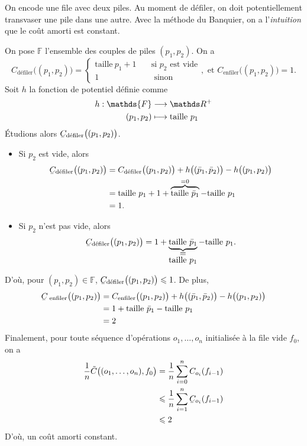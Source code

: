 \documentclass[a4paper]{article}
\begin{document}
	\begin{exm}
		On encode une file avec deux piles.
		Au moment de défiler, on doit potentiellement transvaser une pile dans une autre.
		Avec la méthode du Banquier, on a l'\textit{intuition} que le coût amorti est constant.

		On pose $\mathds{F}$\/ l'ensemble des couples de piles $(p_1, p_2)$.
		On a \[
			C_\text{défiler}\big((p_1, p_2)\big) = \begin{cases}
				\mathrm{taille}\ p_1 + 1 \quad& \text{si $p_2$ est vide}\\
				1 \quad& \text{ sinon}
			\end{cases}, \text{ et } C_\text{enfiler}\big((p_1, p_2)\big) = 1
		.\] Soit $h$\/ la fonction de potentiel définie comme \begin{align*}
			h: \mathds{F} &\longrightarrow \R^+ \\
			(p_1, p_2) &\longmapsto \mathrm{taille}\ p_1
		\end{align*}
		Étudions alors $\ubar{C}_\text{défiler}\big((p_1, p_2)\big)$.
		\begin{itemize}
			\item Si $p_2$\/ est vide, alors
				\begin{align*}
					\ubar{C}_\text{défiler}\big((p_1, p_2)\big) &= C_\text{défiler}\big((p_1,p_2)\big) + h\big((\bar{p}_1, \bar{p}_2)\big) - h\big((p_1, p_2)\big)\\
					&= \mathrm{taille} \ p_1 + 1 + \overbrace{\mathrm{taille}\ \bar{p}_1}^{=0} - \mathrm{taille}\ p_1 \\
					&= 1.
				\end{align*}
			\item Si $p_2$\/ n'est pas vide, alors \[
					\ubar{C}_\text{défiler}\big((p_1, p_2)\big) = 1 + \underbrace{\mathrm{taille}\  \bar{p}_1}_{\substack{\ds=\\ \ds \mathrm{taille}\ p_1}} - \mathrm{taille}\ p_1
				.\]
		\end{itemize}
		D'où, pour $(p_1, p_2) \in \mathds{F}$, $\ubar{C}_ \text{défiler}\big((p_1, p_2)\big) \le 1$.
		De plus,
		\begin{align*}
			\ubar{C}_ \text{ enfiler}\big((p_1, p_2)\big)
			&= C_ \text{enfiler}\big((p_1, p_2)\big) + h\big((\bar{p}_1, \bar{p}_2)\big) - h\big((p_1, p_2)\big) \\
			&= 1 + \mathrm{taille}\ \bar{p}_1 - \mathrm{taille}\ p_1 \\
			&= 2 \\
		\end{align*}
		Finalement, pour toute séquence d'opérations $o_1, \ldots, o_n$\/ initialisée à la file vide $f_0$, on a
		\begin{align*}
			\frac{1}{n} \tilde C\big((o_1,\ldots,o_n), f_0\big)
			&= \frac{1}{n} \sum_{i=0}^n C_{o_i}(f_{i-1}) \\
			&\le \frac{1}{n} \sum_{i=1}^n \ubar{C}_{o_i}(f_{i-1}) \\
			&\le 2
		\end{align*}
		D'où, un coût amorti constant.
	\end{exm}
\end{document}

